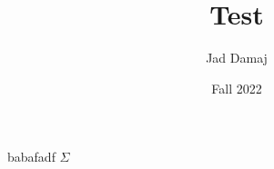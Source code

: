 \documentclass{article}
\title{Test}
\author{Jad Damaj}
\date{Fall 2022}
\begin{document}
    \maketitle 

    babafadf 
    $ \Sigma $
\end{document}
